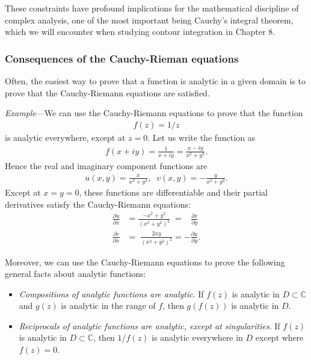 \documentclass[10pt,a4paper]{article}
\begin{document}
\noindent
These constraints have profound implications for the mathematical
discipline of complex analysis, one of the most important being
Cauchy's integral theorem, which we will encounter when studying
contour integration in Chapter 8.

\subsubsection{Consequences of the Cauchy-Rieman equations}
\label{consequences-of-the-cauchy-riemann-equations}

Often, the easiest way to prove that a function is analytic in a given
domain is to prove that the Cauchy-Riemann equations are satisfied.

\begin{framed}\noindent
  \textit{Example}---We can use the Cauchy-Riemann equations to prove
  that the function
  \begin{align}
    f(z)=1/z
  \end{align}
  is analytic everywhere, except at $z = 0$.  Let us write the function as
  \begin{align}
    f(x+iy) = \frac{1}{x+iy} = \frac{x-iy}{x^2+y^2}.
  \end{align}
  Hence the real and imaginary component functions are
  \begin{align}
    u(x,y) = \frac{x}{x^2+y^2}, \;\;v(x,y) = - \frac{y}{x^2+y^2}.
  \end{align}
  Except at $x = y = 0$, these functions are differentiable and their
  partial derivatives satisfy the Cauchy-Riemann equations:
  \begin{align}
    \frac{\partial u}{\partial x} &= \frac{-x^2+y^2}{(x^2+y^2)^2} \;= \;\;\;\frac{\partial v}{\partial y} \\ \frac{\partial v}{\partial x} &= \; \frac{2xy}{(x^2+y^2)^2} = -\frac{\partial u}{\partial y}.
  \end{align}
\end{framed}

Moreover, we can use the Cauchy-Riemann equations to prove the
following general facts about analytic functions:

\begin{itemize}
\item \textit{Compositions of analytic functions are analytic}.  If
  $f(z)$ is analytic in $D \subset \mathbb{C}$ and $g(z)$ is analytic
  in the range of $f$, then $g(f(z))$ is analytic in $D$.

\item \textit{Reciprocals of analytic functions are analytic, except
  at singularities}. If $f(z)$ is analytic in $D \subset \mathbb{C}$,
  then $1/f(z)$ is analytic everywhere in $D$ except where $f(z) = 0$.
\end{itemize}
\end{document}
